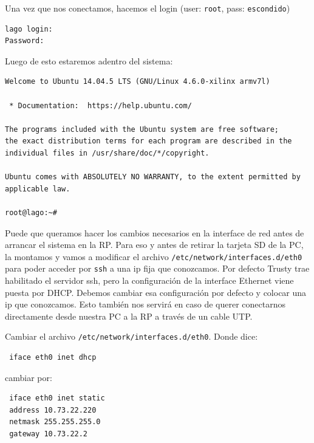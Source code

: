 \documentclass[a4paper,11pt]{article}
\begin{document}
\noindent Una vez que nos conectamos, hacemos el login (user: \texttt{root}, pass: \texttt{escondido})
\begin{verbatim}
lago login: 
Password: 
\end{verbatim}

\noindent Luego de esto estaremos adentro del sistema:

\begin{verbatim}
Welcome to Ubuntu 14.04.5 LTS (GNU/Linux 4.6.0-xilinx armv7l)

 * Documentation:  https://help.ubuntu.com/

The programs included with the Ubuntu system are free software;
the exact distribution terms for each program are described in the
individual files in /usr/share/doc/*/copyright.

Ubuntu comes with ABSOLUTELY NO WARRANTY, to the extent permitted by
applicable law.

root@lago:~# 

\end{verbatim}

\noindent Puede que queramos hacer los cambios necesarios en la interface de red antes de
arrancar el sistema en la RP. Para eso y antes de retirar la tarjeta SD de la
PC, la montamos y vamos a modificar el archivo
\texttt{/etc/network/interfaces.d/eth0} para poder acceder por \texttt{ssh} a una ip fija
que conozcamos. Por defecto Trusty trae habilitado el servidor ssh, pero la
configuración de la interface Ethernet viene puesta por DHCP. Debemos cambiar
esa configuración por defecto y colocar una ip que conozcamos. Esto también nos
servirá en caso de querer conectarnos directamente desde nuestra PC a la RP a
través de un cable UTP.

\noindent Cambiar el archivo \texttt{/etc/network/interfaces.d/eth0}. Donde
dice:

\begin{verbatim}
 iface eth0 inet dhcp
\end{verbatim}

\noindent cambiar por:

\begin{verbatim}
 iface eth0 inet static
 address 10.73.22.220 
 netmask 255.255.255.0
 gateway 10.73.22.2
\end{verbatim}
\end{document}
